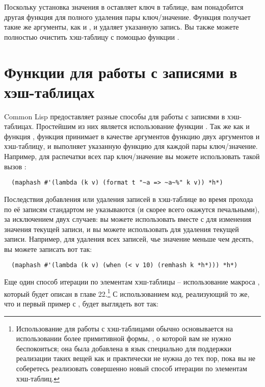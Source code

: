 Поскольку установка значения в  оставляет ключ в таблице, вам понадобится другая
функция для полного удаления пары ключ/значение.  Функция  получает такие же
аргументы, как и , и удаляет указанную запись.  Вы также можете полностью
очистить хэш-таблицу с помощью функции .


\section{Функции для работы с записями в хэш-таблицах}

Common Lisp предоставляет разные способы для работы с записями в хэш-таблицах.  Простейшим
из них является использование функции .  Так же как и функция ,
функция  принимает в качестве аргументов функцию двух аргументов и
хэш-таблицу, и выполняет указанную функцию для каждой пары ключ/значение.  Например, для
распечатки всех пар ключ/значение вы можете использовать такой вызов :

\begin{verbatim}
  (maphash #'(lambda (k v) (format t "~a => ~a~%" k v)) *h*)
\end{verbatim}

Последствия добавления или удаления записей в хэш-таблице во время прохода по её записям
стандартом не указываются (и скорее всего окажутся печальными), за исключением двух
случаев: вы можете использовать  вместе с  для изменения значения
текущей записи, и вы можете использовать  для удаления текущей записи.
Например, для удаления всех записей, чье значение меньше чем десять, вы можете записать
вот так:

\begin{verbatim}
  (maphash #'(lambda (k v) (when (< v 10) (remhash k *h*))) *h*)
\end{verbatim}

Еще один способ итерации по элементам хэш-таблицы -- использование макроса
, который будет описан в главе 22.\footnote{Использование  для
  работы с хэш-таблицами обычно основывается на использовании более примитивной формы,
  , о которой вам не нужно беспокоиться; она была добавлена
  в язык специально для поддержки реализации таких вещей как  и практически не
  нужна до тех пор, пока вы не соберетесь реализовать совершенно новый способ итерации по
  элементам хэш-таблиц.}  С использованием  код, реализующий то же, что и первый
пример с , будет выглядеть вот так:

